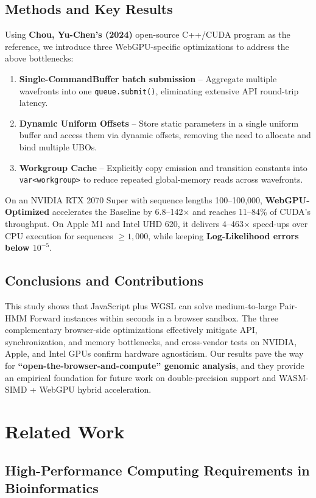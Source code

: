 \documentclass[PhD]{PHlab-thesis}
\begin{document}
\section{Methods and Key Results}
Using \textbf{Chou, Yu-Chen's (2024)} open-source C++/CUDA program as the reference, we introduce three WebGPU-specific optimizations to address the above bottlenecks:
\begin{enumerate}
    \item \textbf{Single-CommandBuffer batch submission} – Aggregate multiple wavefronts into one \texttt{queue.submit()}, eliminating extensive API round-trip latency.
    \item \textbf{Dynamic Uniform Offsets} – Store static parameters in a single uniform buffer and access them via dynamic offsets, removing the need to allocate and bind multiple UBOs.
    \item \textbf{Workgroup Cache} – Explicitly copy emission and transition constants into \texttt{var<workgroup>} to reduce repeated global-memory reads across wavefronts.
\end{enumerate}
On an NVIDIA RTX 2070 Super with sequence lengths 100–100,000, \textbf{WebGPU-Optimized} accelerates the Baseline by 6.8–142$\times$ and reaches 11–84\% of CUDA’s throughput. On Apple M1 and Intel UHD 620, it delivers 4–463$\times$ speed-ups over CPU execution for sequences $\geq 1,000$, while keeping \textbf{Log-Likelihood errors below $10^{-5}$}.

\section{Conclusions and Contributions}
This study shows that JavaScript plus WGSL can solve medium-to-large Pair-HMM Forward instances within seconds in a browser sandbox. The three complementary browser-side optimizations effectively mitigate API, synchronization, and memory bottlenecks, and cross-vendor tests on NVIDIA, Apple, and Intel GPUs confirm hardware agnosticism. Our results pave the way for \textbf{``open-the-browser-and-compute'' genomic analysis}, and they provide an empirical foundation for future work on double-precision support and WASM-SIMD + WebGPU hybrid acceleration.


\chapter{Related Work}
\section{High-Performance Computing Requirements in Bioinformatics}
\end{document}
